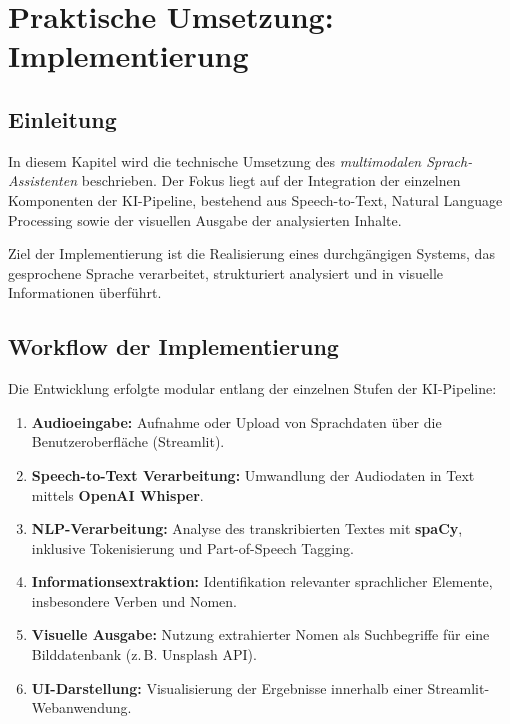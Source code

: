 \chapter{Praktische Umsetzung: Implementierung}
\label{sec:implementierung}

\section{Einleitung}
In diesem Kapitel wird die technische Umsetzung des \textit{multimodalen Sprach-Assistenten} beschrieben. Der Fokus liegt auf der Integration der einzelnen Komponenten der KI-Pipeline, bestehend aus Speech-to-Text, Natural Language Processing sowie der visuellen Ausgabe der analysierten Inhalte.

Ziel der Implementierung ist die Realisierung eines durchgängigen Systems, das gesprochene Sprache verarbeitet, strukturiert analysiert und in visuelle Informationen überführt.

\section{Workflow der Implementierung}
Die Entwicklung erfolgte modular entlang der einzelnen Stufen der KI-Pipeline:

\begin{enumerate}
    \item \textbf{Audioeingabe:} Aufnahme oder Upload von Sprachdaten über die Benutzeroberfläche (Streamlit).
    
    \item \textbf{Speech-to-Text Verarbeitung:} Umwandlung der Audiodaten in Text mittels \textbf{OpenAI Whisper}.
    
    \item \textbf{NLP-Verarbeitung:} Analyse des transkribierten Textes mit \textbf{spaCy}, inklusive Tokenisierung und Part-of-Speech Tagging.
    
    \item \textbf{Informationsextraktion:} Identifikation relevanter sprachlicher Elemente, insbesondere Verben und Nomen.
    
    \item \textbf{Visuelle Ausgabe:} Nutzung extrahierter Nomen als Suchbegriffe für eine Bilddatenbank (z.\,B. Unsplash API).
    
    \item \textbf{UI-Darstellung:} Visualisierung der Ergebnisse innerhalb einer Streamlit-Webanwendung.
\end{enumerate}

